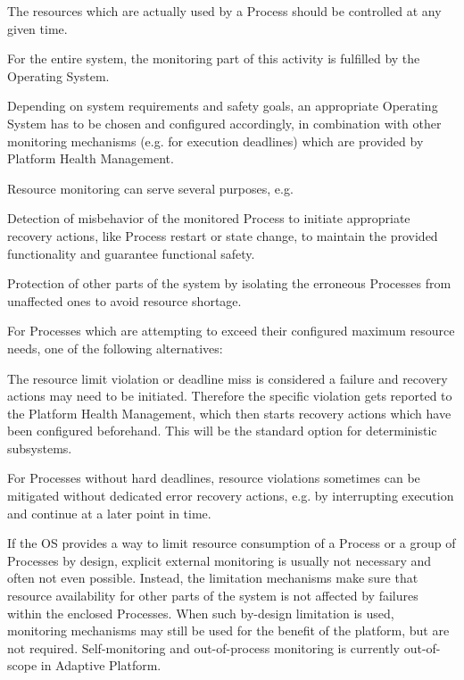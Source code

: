 \begin{DoxyItemize}
\item The resources which are actually used by a Process should be controlled at any given time.
\item For the entire system, the monitoring part of this activity is fulfilled by the Operating System.
\item Depending on system requirements and safety goals, an appropriate Operating System has to be chosen and configured accordingly, in combination with other monitoring mechanisms (e.\+g. for execution deadlines) which are provided by Platform Health Management.
\item Resource monitoring can serve several purposes, e.\+g.
\begin{DoxyItemize}
\item Detection of misbehavior of the monitored Process to initiate appropriate recovery actions, like Process restart or state change, to maintain the provided functionality and guarantee functional safety.
\item Protection of other parts of the system by isolating the erroneous Processes from unaffected ones to avoid resource shortage.
\end{DoxyItemize}
\item For Processes which are attempting to exceed their configured maximum resource needs, one of the following alternatives\+:
\begin{DoxyItemize}
\item The resource limit violation or deadline miss is considered a failure and recovery actions may need to be initiated. Therefore the specific violation gets reported to the Platform Health Management, which then starts recovery actions which have been configured beforehand. This will be the standard option for deterministic subsystems.
\item For Processes without hard deadlines, resource violations sometimes can be mitigated without dedicated error recovery actions, e.\+g. by interrupting execution and continue at a later point in time.
\item If the OS provides a way to limit resource consumption of a Process or a group of Processes by design, explicit external monitoring is usually not necessary and often not even possible. Instead, the limitation mechanisms make sure that resource availability for other parts of the system is not affected by failures within the enclosed Processes. When such by-\/design limitation is used, monitoring mechanisms may still be used for the benefit of the platform, but are not required. Self-\/monitoring and out-\/of-\/process monitoring is currently out-\/of-\/scope in Adaptive Platform.
\end{DoxyItemize}
\end{DoxyItemize}

